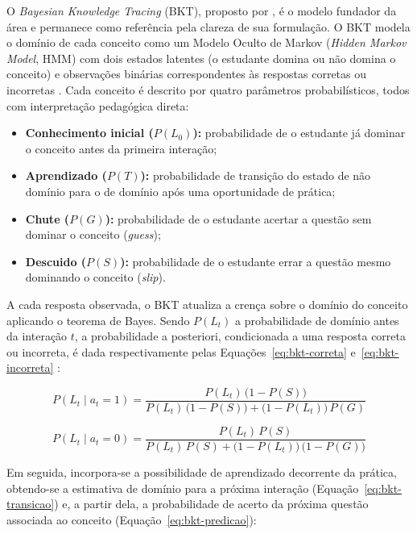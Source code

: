 O \textit{Bayesian Knowledge Tracing} (BKT), proposto por , é o modelo fundador da área e permanece como referência pela clareza de sua formulação. O BKT modela o domínio de cada conceito como um Modelo Oculto de Markov (\textit{Hidden Markov Model}, HMM) com dois estados latentes (o estudante domina ou não domina o conceito) e observações binárias correspondentes às respostas corretas ou incorretas \cite{pelanek_bayesian_2017, nagatani_augmenting_2019}. Cada conceito é descrito por quatro parâmetros probabilísticos, todos com interpretação pedagógica direta:

\begin{itemize}
    \item \textbf{Conhecimento inicial ($P(L_0)$):} probabilidade de o estudante já dominar o conceito antes da primeira interação;
    \item \textbf{Aprendizado ($P(T)$):} probabilidade de transição do estado de não domínio para o de domínio após uma oportunidade de prática;
    \item \textbf{Chute ($P(G)$):} probabilidade de o estudante acertar a questão sem dominar o conceito (\textit{guess});
    \item \textbf{Descuido ($P(S)$):} probabilidade de o estudante errar a questão mesmo dominando o conceito (\textit{slip}).
\end{itemize}

A cada resposta observada, o BKT atualiza a crença sobre o domínio do conceito aplicando o teorema de Bayes. Sendo $P(L_t)$ a probabilidade de domínio antes da interação $t$, a probabilidade a posteriori, condicionada a uma resposta correta ou incorreta, é dada respectivamente pelas Equações~\ref{eq:bkt-correta} e~\ref{eq:bkt-incorreta} \cite{corbett_knowledge_1994, pelanek_bayesian_2017}:

\begin{equation}
\label{eq:bkt-correta}
P(L_t \mid a_t = 1) = \frac{P(L_t)\,\bigl(1 - P(S)\bigr)}{P(L_t)\,\bigl(1 - P(S)\bigr) + \bigl(1 - P(L_t)\bigr)\,P(G)}
\end{equation}

\begin{equation}
\label{eq:bkt-incorreta}
P(L_t \mid a_t = 0) = \frac{P(L_t)\,P(S)}{P(L_t)\,P(S) + \bigl(1 - P(L_t)\bigr)\,\bigl(1 - P(G)\bigr)}
\end{equation}

Em seguida, incorpora-se a possibilidade de aprendizado decorrente da prática, obtendo-se a estimativa de domínio para a próxima interação (Equação~\ref{eq:bkt-transicao}) e, a partir dela, a probabilidade de acerto da próxima questão associada ao conceito (Equação~\ref{eq:bkt-predicao}):

